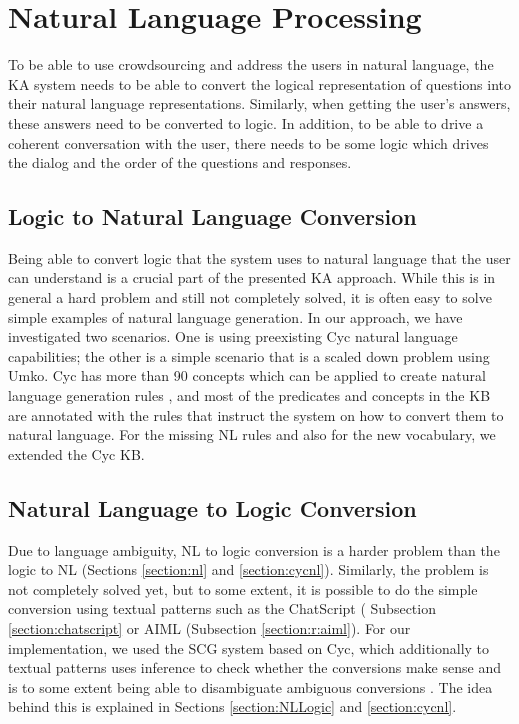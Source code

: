 \section{Natural Language Processing}
\label{section:bg:nlp}
To be able to use crowdsourcing and address the users in natural language, the 
KA system needs to be able to convert the logical representation of questions 
into their natural language representations. Similarly, when getting the user's 
answers, these answers need to be converted to logic. In addition, to be 
able to drive a coherent conversation with the user, there needs to be some 
logic which drives the dialog and the order of the questions and responses.

\subsection{Logic to Natural Language Conversion}
Being able to convert logic that the system uses to natural language that the 
user can understand is a crucial part of the presented KA approach. While this is 
in general a hard problem and still not completely solved, it is often easy to 
solve simple examples of natural language generation. In our approach, we have 
investigated two scenarios. One is using preexisting Cyc natural language 
capabilities; the other is a simple scenario that is a scaled down problem 
using Umko. Cyc has more than 90 concepts which can be applied to create 
natural language generation rules \parencite{Baxter2005}, and most of the 
predicates and concepts in the KB are annotated with the rules that instruct 
the system on how to convert them to natural language. For the missing NL 
rules and also for the new vocabulary, we extended the Cyc KB.

\subsection{Natural Language to Logic Conversion}
\label{section:bg:nlToLogic}
Due to language ambiguity, 
NL to logic conversion is a harder problem than the logic to NL
\parencite{Schneider2015} (Sections \ref{section:nl} and \ref{section:cycnl}). 
Similarly, the problem is not completely solved yet, but to some extent, it is 
possible to do the simple conversion using textual patterns such as the 
ChatScript ( Subsection \ref{section:chatscript} or AIML (Subsection \ref{section:r:aiml}). 
For our implementation, we used the SCG system based on Cyc, which additionally to textual patterns uses inference to check whether the conversions make sense and is to some extent being able to disambiguate ambiguous conversions \parencite{Schneider2015}.
The idea behind this is explained in Sections \ref{section:NLLogic} and
\ref{section:cycnl}.

